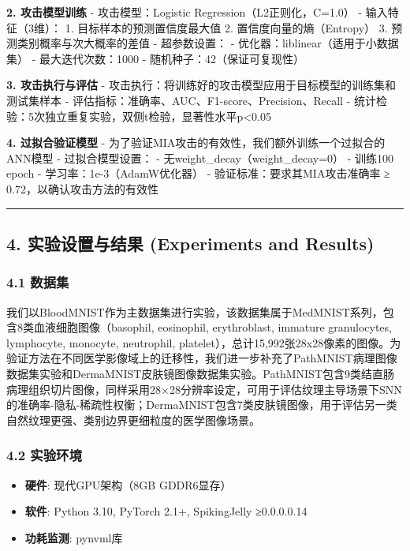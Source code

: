 \documentclass[
]{article}
\providecommand{\tightlist}{%
  \setlength{\itemsep}{0pt}\setlength{\parskip}{0pt}}
\begin{document}
\textbf{2. 攻击模型训练} - 攻击模型：Logistic
Regression（L2正则化，C=1.0） - 输入特征（3维）： 1.
目标样本的预测置信度最大值 2. 置信度向量的熵（Entropy） 3.
预测类别概率与次大概率的差值 - 超参数设置： -
优化器：liblinear（适用于小数据集） - 最大迭代次数：1000 -
随机种子：42（保证可复现性）

\textbf{3. 攻击执行与评估} -
攻击执行：将训练好的攻击模型应用于目标模型的训练集和测试集样本 -
评估指标：准确率、AUC、F1-score、Precision、Recall -
统计检验：5次独立重复实验，双侧t检验，显著性水平p\textless0.05

\textbf{4. 过拟合验证模型} -
为了验证MIA攻击的有效性，我们额外训练一个过拟合的ANN模型 -
过拟合模型设置： - 无weight\_decay（weight\_decay=0） - 训练100 epoch -
学习率：1e-3（AdamW优化器） - 验证标准：要求其MIA攻击准确率 ≥
0.72，以确认攻击方法的有效性

\begin{center}\rule{0.5\linewidth}{0.5pt}\end{center}

\subsection{4. 实验设置与结果 (Experiments and
Results)}\label{ux5b9eux9a8cux8bbeux7f6eux4e0eux7ed3ux679c-experiments-and-results}

\subsubsection{4.1 数据集}\label{ux6570ux636eux96c6}

我们以BloodMNIST作为主数据集进行实验，该数据集属于MedMNIST系列，包含8类血液细胞图像（basophil,
eosinophil, erythroblast, immature granulocytes, lymphocyte, monocyte,
neutrophil,
platelet），总计15,992张28x28像素的图像。为验证方法在不同医学影像域上的迁移性，我们进一步补充了PathMNIST病理图像数据集实验和DermaMNIST皮肤镜图像数据集实验。PathMNIST包含9类结直肠病理组织切片图像，同样采用28×28分辨率设定，可用于评估纹理主导场景下SNN的准确率-隐私-稀疏性权衡；DermaMNIST包含7类皮肤镜图像，用于评估另一类自然纹理更强、类别边界更细粒度的医学图像场景。

\subsubsection{4.2 实验环境}\label{ux5b9eux9a8cux73afux5883}

\begin{itemize}
\tightlist
\item
  \textbf{硬件}: 现代GPU架构（8GB GDDR6显存）
\item
  \textbf{软件}: Python 3.10, PyTorch 2.1+, SpikingJelly ≥0.0.0.0.14
\item
  \textbf{功耗监测}: pynvml库
\end{itemize}
\end{document}
